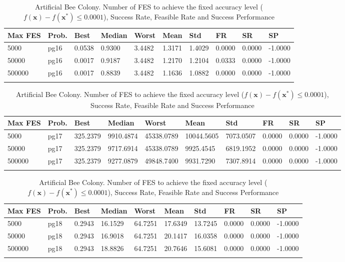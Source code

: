 \documentclass[10pt, a4paper]{book}
\begin{document}
\begin{center}
\begin{longtable}{l l l l l l l l l l}
\textbf{Max FES} & \textbf{Prob.} & \textbf{Best} & \textbf{Median} & \textbf{Worst} & \textbf{Mean} & \textbf{Std} & \textbf{FR} & \textbf{SR} & \textbf{SP} \\
\hline
5000 & pg16 & 0.0538 & 0.9300 & 3.4482 & 1.3171 & 1.4029 & 0.0000 & 0.0000 & -1.0000 \\
50000 & pg16 & 0.0017 & 0.9187 & 3.4482 & 1.2170 & 1.2104 & 0.0333 & 0.0000 & -1.0000 \\
500000 & pg16 & 0.0017 & 0.8839 & 3.4482 & 1.1636 & 1.0882 & 0.0000 & 0.0000 & -1.0000 \\

\caption{ Artificial Bee Colony. Number of FES to achieve the fixed accuracy level ($f(\mathbf{x}) - f(\mathbf{x}^{*}) \leq 0.0001$), Success Rate, Feasible Rate and Success Performance }
\end{longtable}
\end{center}

\begin{center}
\begin{longtable}{l l l l l l l l l l}
\textbf{Max FES} & \textbf{Prob.} & \textbf{Best} & \textbf{Median} & \textbf{Worst} & \textbf{Mean} & \textbf{Std} & \textbf{FR} & \textbf{SR} & \textbf{SP} \\
\hline
5000 & pg17 & 325.2379 & 9910.4874 & 45338.0789 & 10044.5605 & 7073.0507 & 0.0000 & 0.0000 & -1.0000 \\
50000 & pg17 & 325.2379 & 9717.6914 & 45338.0789 & 9925.4545 & 6819.1952 & 0.0000 & 0.0000 & -1.0000 \\
500000 & pg17 & 325.2379 & 9277.0879 & 49848.7400 & 9931.7290 & 7307.8914 & 0.0000 & 0.0000 & -1.0000 \\

\caption{ Artificial Bee Colony. Number of FES to achieve the fixed accuracy level ($f(\mathbf{x}) - f(\mathbf{x}^{*}) \leq 0.0001$), Success Rate, Feasible Rate and Success Performance }
\end{longtable}
\end{center}

\begin{center}
\begin{longtable}{l l l l l l l l l l}
\textbf{Max FES} & \textbf{Prob.} & \textbf{Best} & \textbf{Median} & \textbf{Worst} & \textbf{Mean} & \textbf{Std} & \textbf{FR} & \textbf{SR} & \textbf{SP} \\
\hline
5000 & pg18 & 0.2943 & 16.1529 & 64.7251 & 17.6349 & 13.7245 & 0.0000 & 0.0000 & -1.0000 \\
50000 & pg18 & 0.2943 & 16.9018 & 64.7251 & 20.1417 & 16.0358 & 0.0000 & 0.0000 & -1.0000 \\
500000 & pg18 & 0.2943 & 18.8826 & 64.7251 & 20.7646 & 15.6081 & 0.0000 & 0.0000 & -1.0000 \\

\caption{ Artificial Bee Colony. Number of FES to achieve the fixed accuracy level ($f(\mathbf{x}) - f(\mathbf{x}^{*}) \leq 0.0001$), Success Rate, Feasible Rate and Success Performance }
\end{longtable}
\end{center}
\end{document}
